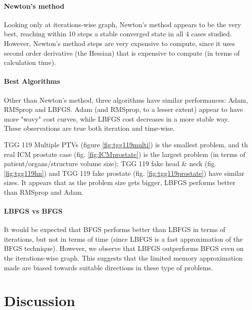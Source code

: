 \documentclass[a4paper]{article}
\begin{document}
	\paragraph{Newton's method}
	Looking only at iterations-wise graph, Newton's method appears to be the very best, reaching within 10 steps a stable converged state in all 4 cases studied.
	However, Newton's method steps are very expensive to compute, since it uses second order derivative (the Hessian) that is expensive to compute (in terms of calculation time).
	
	\paragraph{Best Algorithms}
	Other than Newton's method, three algorithms have similar performances: Adam, RMSprop and LBFGS.
	Adam (and RMSprop, to a lesser extent) appear to have more "wavy" cost curves, while LBFGS cost decreases in a more stable way.
	These observations are true both iteration and time-wise.
	
	TGG 119 Multiple PTVs (figure \ref{fig:tgg119multi}) is the smallest problem, and th real ICM prostate case (fig. \ref{fig:ICMprostate}) is the largest problem (in terms of patient/organs/structure volume size); TGG 119 fake head \& neck (fig. \ref{fig:tgg119hn}) and TGG 119 fake prostate (fig. \ref{fig:tgg119prostate}) have similar sizes.
	It appears that as the problem size gets bigger, LBFGS performs better than RMSprop and Adam.
	
	\paragraph{LBFGS vs BFGS}
	It would be expected that BFGS performs better than LBFGS in terms of iterations, but not in terms of time (since LBFGS is a fast approximation of the BFGS technique).
	However, we observe that LBFGS outperforms BFGS even on the iterations-wise graph.
	This suggests that the limited memory approximation made are biased towards suitable directions in these type of problems.
	
	\section{Discussion}
	
	
	
	
\end{document}
